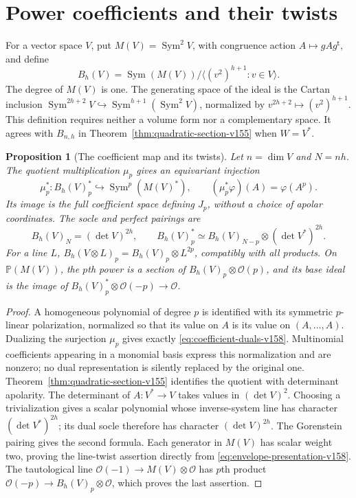 \documentclass[11pt,reqno]{amsart}
\numberwithin{equation}{section}
\newtheorem{proposition}[theorem]{Proposition}
\theoremstyle{definition}\newtheorem{definition}[theorem]{Definition}
\theoremstyle{remark}\newtheorem{remark}[theorem]{Remark}
\newcommand{\Pj}{\mathbb P}\newcommand{\A}{\mathbb A}
\newcommand{\OO}{\mathcal O}\newcommand{\II}{\mathcal I}
\DeclareMathOperator{\Sym}{Sym}\DeclareMathOperator{\Gr}{Gr}
\begin{document}
\section{Power coefficients and their twists}
\label{sec:power-conventions-v158}
For a vector space $V$, put $M(V)=\Sym^2V$, with congruence action
$A\mapsto gAg^{\mathsf t}$, and define
\begin{equation}\label{eq:envelope-presentation-v158}
 B_h(V)=\Sym(M(V))/\langle (v^2)^{h+1}:v\in V\rangle .
\end{equation}
The degree of $M(V)$ is one. The generating space of the ideal is the
Cartan inclusion $\Sym^{2h+2}V\hookrightarrow\Sym^{h+1}(\Sym^2V)$,
normalized by $v^{2h+2}\mapsto(v^2)^{h+1}$. This definition requires
neither a volume form nor a complementary space. It agrees with
$B_{n,h}$ in Theorem~\ref{thm:quadratic-section-v155} when $W=V^*$.

\begin{proposition}[The coefficient map and its twists]
\label{prop:coefficient-conventions-v158}
Let $n=\dim V$ and $N=nh$. The quotient multiplication $\mu_p$ gives
an equivariant injection
\begin{equation}\label{eq:coefficient-duals-v158}
 \mu_p^*:B_h(V)_p^*\hookrightarrow\Sym^p(M(V)^*),
 \qquad (\mu_p^*\varphi)(A)=\varphi(A^p).
\end{equation}
Its image is the full coefficient space defining $J_p$, without a
choice of apolar coordinates. The socle and perfect pairings are
\begin{equation}\label{eq:perfect-twist-v158}
 B_h(V)_N=(\det V)^{2h},\qquad
 B_h(V)_p^*\simeq B_h(V)_{N-p}\otimes(\det V^*)^{2h}.
\end{equation}
For a line $L$, $B_h(V\otimes L)_p=B_h(V)_p\otimes L^{2p}$,
compatibly with all products. On $\Pj(M(V))$, the $p$th power is a
section of $B_h(V)_p\otimes\OO(p)$, and its base ideal is the image
of $B_h(V)_p^*\otimes\OO(-p)\to\OO$.
\end{proposition}
\begin{proof}
A homogeneous polynomial of degree $p$ is identified with its symmetric
$p$-linear polarization, normalized so that its value on $A$ is its
value on $(A,\ldots,A)$. Dualizing the surjection $\mu_p$ gives exactly
\eqref{eq:coefficient-duals-v158}. Multinomial coefficients appearing
in a monomial basis express this normalization and are nonzero; no
dual representation is silently replaced by the original one.
Theorem~\ref{thm:quadratic-section-v155} identifies the quotient with
determinant apolarity. The determinant of $A:V^*\to V$ takes values
in $(\det V)^2$. Choosing a trivialization gives a scalar polynomial
whose inverse-system line has character $(\det V^*)^{2h}$; its dual
socle therefore has character $(\det V)^{2h}$. The Gorenstein pairing
gives the second formula. Each generator in $M(V)$ has scalar weight
two, proving the line-twist assertion directly from
\eqref{eq:envelope-presentation-v158}. The tautological line
$\OO(-1)\to M(V)\otimes\OO$ has $p$th product
$\OO(-p)\to B_h(V)_p\otimes\OO$, which proves the last assertion.
\end{proof}
\end{document}
